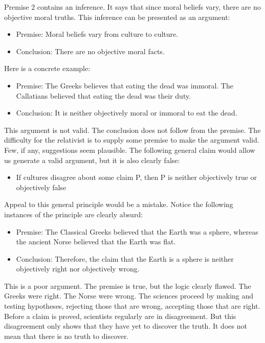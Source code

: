 \documentclass[9pt]{article}
\providecommand{\tightlist}{%
  \setlength{\itemsep}{0pt}\setlength{\parskip}{0pt}}
\begin{document}
Premise 2 contains an inference. It says that since moral beliefs vary,
there are no objective moral truths. This inference can be presented as
an argument:

\begin{itemize}
\tightlist
\item
  Premise: Moral beliefs vary from culture to culture.
\item
  Conclusion: There are no objective moral facts.
\end{itemize}

Here is a concrete example:

\begin{itemize}
\tightlist
\item
  Premise: The Greeks believes that eating the dead was immoral. The
  Callatians believed that eating the dead was their duty.
\item
  Conclusion: It is neither objectively moral or immoral to eat the
  dead.
\end{itemize}

This argument is not valid. The conclusion does not follow from the
premise. The difficulty for the relativist is to supply some premise to
make the argument valid. Few, if any, suggestions seem plausible. The
following general claim would allow us generate a valid argument, but it
is also clearly false:

\begin{itemize}
\tightlist
\item
  If cultures disagree about some claim P, then P is neither objectively
  true or objectively false
\end{itemize}

Appeal to this general principle would be a mistake. Notice the
following instances of the principle are clearly absurd:

\begin{itemize}
\tightlist
\item
  Premise: The Classical Greeks believed that the Earth was a sphere,
  whereas the ancient Norse believed that the Earth was flat.
\item
  Conclusion: Therefore, the claim that the Earth is a sphere is neither
  objectively right nor objectively wrong.
\end{itemize}

This is a poor argument. The premise is true, but the logic clearly
flawed. The Greeks were right. The Norse were wrong. The sciences
proceed by making and testing hypotheses, rejecting those that are
wrong, accepting those that are right. Before a claim is proved,
scientists regularly are in disagreement. But this disagreement only
shows that they have yet to discover the truth. It does not mean that
there is no truth to discover.
\end{document}

